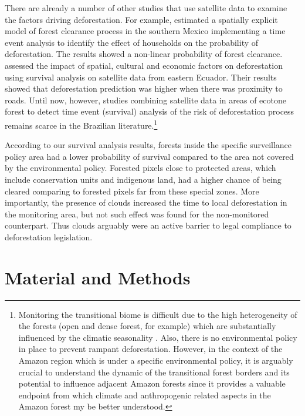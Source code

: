 There are already a number of other studies that use satellite data to examine the factors driving deforestation.  For example, \citet{vance_2002} estimated a spatially explicit model of forest clearance process in the southern Mexico implementing a time event analysis to identify the effect of households on the probability of deforestation. The results showed a non-linear probability of forest clearance. \citet{greenberg_2005} assessed the impact of spatial, cultural and economic factors on deforestation using survival analysis on satellite data from eastern Ecuador. Their results showed that deforestation prediction was higher when there was proximity to roads. Until now, however, studies combining satellite data in areas of ecotone forest to detect time event (survival) analysis of the risk of deforestation process remains scarce in the Brazilian literature.\footnote{Monitoring the transitional biome is difficult due to the high heterogeneity of the forests (open and dense forest, for example) which are substantially influenced by the climatic seasonality \citep{bayma_sano_2015}. Also, there is no environmental policy in place to prevent rampant deforestation. However, in the context of the Amazon region which is under a specific environmental policy, it is arguably crucial to understand the dynamic of the transitional forest borders and its potential to influence adjacent Amazon forests since it provides a valuable endpoint from which climate and anthropogenic related aspects in the Amazon forest my be better understood.} 


According to our survival analysis results, forests inside the specific surveillance policy area had a lower probability of survival compared to the area not covered by the environmental policy. Forested pixels close to protected areas,  which include conservation units and indigenous land, had a higher chance of being cleared comparing to forested pixels far from these special zones. More importantly, the presence of clouds increased the time to local deforestation in the monitoring area, but not such effect was found for the non-monitored counterpart.  Thus clouds arguably were an active barrier to legal compliance to deforestation legislation.

\section{Material and Methods}
\label{S:2}



